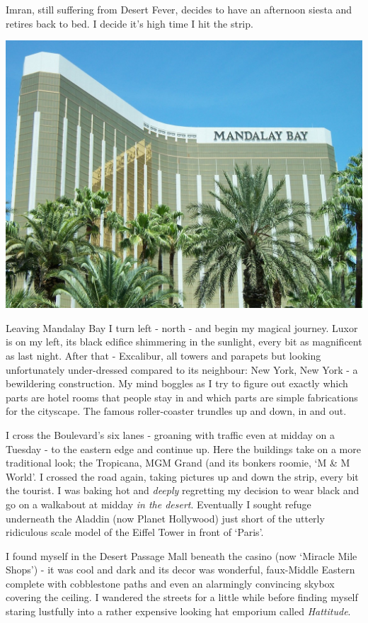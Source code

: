 \documentclass[a5paper,titlepage,11pt]{book}
\begin{document}
Imran, still suffering from Desert Fever, decides to have an afternoon siesta and retires back to bed. I decide it's high time I hit the strip.

\begin{center}\includegraphics[width=\textwidth]{gfx/100_1388}\end{center}

Leaving Mandalay Bay I turn left - north - and begin my magical journey. Luxor is on my left, its black edifice shimmering in the sunlight, every bit as magnificent as last night. After that - Excalibur, all towers and parapets but looking unfortunately under-dressed compared to its neighbour: New York, New York - a bewildering construction. My mind boggles as I try to figure out exactly which parts are hotel rooms that people stay in and which parts are simple fabrications for the cityscape. The famous roller-coaster trundles up and down, in and out.

I cross the Boulevard's six lanes - groaning with traffic even at midday on a Tuesday - to the eastern edge and continue up. Here the buildings take on a more traditional look; the Tropicana, MGM Grand (and its bonkers roomie, `M \& M World'. I crossed the road again, taking pictures up and down the strip, every bit the tourist. I was baking hot and \emph{deeply} regretting my decision to wear black and go on a walkabout at midday \emph{in the desert}. Eventually I sought refuge underneath the Aladdin (now Planet Hollywood) just short of the utterly ridiculous scale model of the Eiffel Tower in front of `Paris'.

I found myself in the Desert Passage Mall beneath the casino (now `Miracle Mile Shops') - it was cool and dark and its decor was wonderful, faux-Middle Eastern complete with cobblestone paths and even an alarmingly convincing skybox covering the ceiling. I wandered the streets for a little while before finding myself staring lustfully into a rather expensive looking hat emporium called \emph{Hattitude}.
\end{document}
